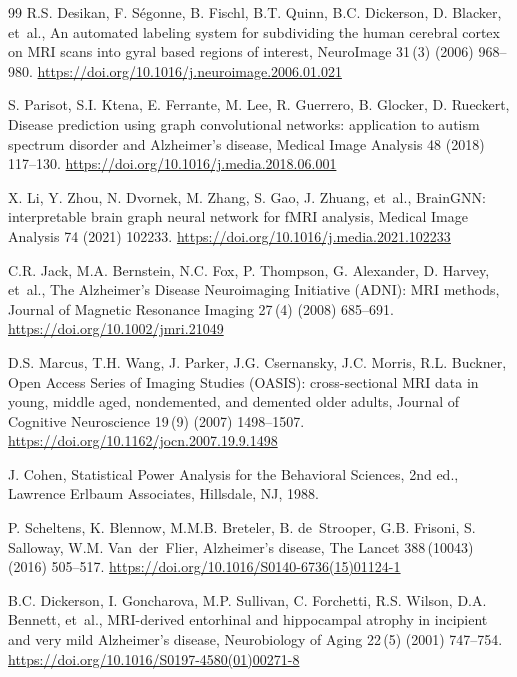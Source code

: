 \documentclass[12pt,a4paper]{article}
\begin{document}
\begin{thebibliography}{99}
R.S. Desikan, F. S\'{e}gonne, B. Fischl, B.T. Quinn, B.C. Dickerson, D. Blacker, et~al., An automated labeling system for subdividing the human cerebral cortex on MRI scans into gyral based regions of interest, NeuroImage 31\,(3) (2006) 968--980.
\url{https://doi.org/10.1016/j.neuroimage.2006.01.021}

S. Parisot, S.I. Ktena, E. Ferrante, M. Lee, R. Guerrero, B. Glocker, D. Rueckert, Disease prediction using graph convolutional networks: application to autism spectrum disorder and Alzheimer's disease, Medical Image Analysis 48 (2018) 117--130.
\url{https://doi.org/10.1016/j.media.2018.06.001}

X. Li, Y. Zhou, N. Dvornek, M. Zhang, S. Gao, J. Zhuang, et~al., BrainGNN: interpretable brain graph neural network for fMRI analysis, Medical Image Analysis 74 (2021) 102233.
\url{https://doi.org/10.1016/j.media.2021.102233}

C.R. Jack, M.A. Bernstein, N.C. Fox, P. Thompson, G. Alexander, D. Harvey, et~al., The Alzheimer's Disease Neuroimaging Initiative (ADNI): MRI methods, Journal of Magnetic Resonance Imaging 27\,(4) (2008) 685--691.
\url{https://doi.org/10.1002/jmri.21049}

D.S. Marcus, T.H. Wang, J. Parker, J.G. Csernansky, J.C. Morris, R.L. Buckner, Open Access Series of Imaging Studies (OASIS): cross-sectional MRI data in young, middle aged, nondemented, and demented older adults, Journal of Cognitive Neuroscience 19\,(9) (2007) 1498--1507.
\url{https://doi.org/10.1162/jocn.2007.19.9.1498}

J. Cohen, Statistical Power Analysis for the Behavioral Sciences, 2nd ed., Lawrence Erlbaum Associates, Hillsdale, NJ, 1988.

P. Scheltens, K. Blennow, M.M.B. Breteler, B. de~Strooper, G.B. Frisoni, S. Salloway, W.M. Van~der~Flier, Alzheimer's disease, The Lancet 388\,(10043) (2016) 505--517.
\url{https://doi.org/10.1016/S0140-6736(15)01124-1}

B.C. Dickerson, I. Goncharova, M.P. Sullivan, C. Forchetti, R.S. Wilson, D.A. Bennett, et~al., MRI-derived entorhinal and hippocampal atrophy in incipient and very mild Alzheimer's disease, Neurobiology of Aging 22\,(5) (2001) 747--754.
\url{https://doi.org/10.1016/S0197-4580(01)00271-8}


\end{thebibliography}
\end{document}

